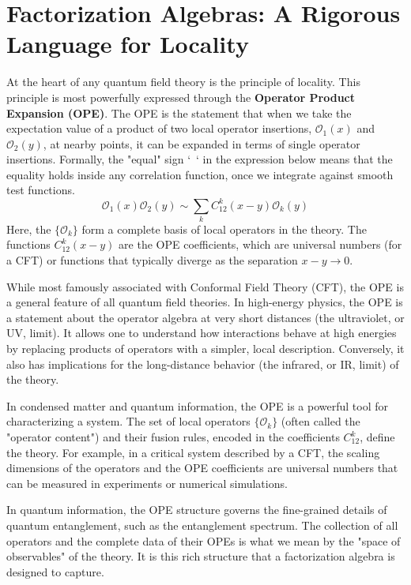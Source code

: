 \section{Factorization Algebras: A Rigorous Language for Locality}

At the heart of any quantum field theory is the principle of locality. This principle is most powerfully expressed through the \textbf{Operator Product Expansion (OPE)}. The OPE is the statement that when we take the expectation value of a product of two local operator insertions, $\mathcal{O}_1(x)$ and $\mathcal{O}_2(y)$, at nearby points, it can be expanded in terms of single operator insertions. Formally, the "equal" sign `~` in the expression below means that the equality holds inside any correlation function, once we integrate against smooth test functions.
\begin{equation}
    \mathcal{O}_1(x) \mathcal{O}_2(y) \sim \sum_k C_{12}^k(x-y) \mathcal{O}_k(y)
    \label{eq:ope_intro}
\end{equation}
Here, the $\{\mathcal{O}_k\}$ form a complete basis of local operators in the theory. The functions $C_{12}^k(x-y)$ are the OPE coefficients, which are universal numbers (for a CFT) or functions that typically diverge as the separation $x-y \to 0$.

While most famously associated with Conformal Field Theory (CFT), the OPE is a general feature of all quantum field theories. In high-energy physics, the OPE is a statement about the operator algebra at very short distances (the ultraviolet, or UV, limit). It allows one to understand how interactions behave at high energies by replacing products of operators with a simpler, local description. Conversely, it also has implications for the long-distance behavior (the infrared, or IR, limit) of the theory.

In condensed matter and quantum information, the OPE is a powerful tool for characterizing a system. The set of local operators $\{\mathcal{O}_k\}$ (often called the "operator content") and their fusion rules, encoded in the coefficients $C_{12}^k$, define the theory. For example, in a critical system described by a CFT, the scaling dimensions of the operators and the OPE coefficients are universal numbers that can be measured in experiments or numerical simulations. 


In quantum information, the OPE structure governs the fine-grained details of quantum entanglement, such as the entanglement spectrum. The collection of all operators and the complete data of their OPEs is what we mean by the "space of observables" of the theory. It is this rich structure that a factorization algebra is designed to capture.

